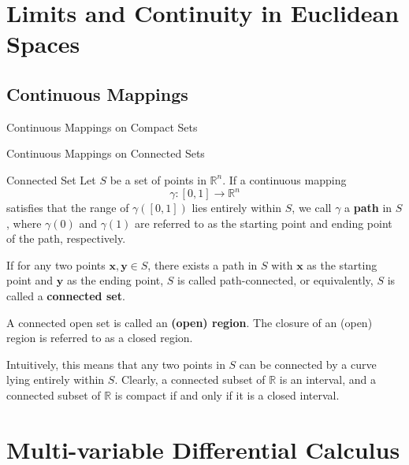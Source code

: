 \documentclass[11pt]{../../TexTemplate/elegantbook}
\begin{document}
\chapter{Limits and Continuity in Euclidean Spaces}

\section{Continuous Mappings}
\begin{leftbarTitle}{Continuous Mappings on Compact Sets}\end{leftbarTitle}

\begin{leftbarTitle}{Continuous Mappings on Connected Sets}\end{leftbarTitle}
\begin{definition}{Connected Set}
    Let \(S\) be a set of points in \(\mathbb{R}^n\). 
    If a continuous mapping 
    \[
        \gamma: [0, 1] \to \mathbb{R}^n
    \]
    satisfies that the range of \(\gamma([0, 1])\) lies entirely within \(S\), 
    we call \(\gamma\) a \textbf{path} in \(S\), 
    where \(\gamma(0)\) and \(\gamma(1)\) are referred to as the starting point and ending point of the path, respectively.  
    
    If for any two points \(\mathbf{x}, \mathbf{y} \in S\), 
    there exists a path in \(S\) with \(\mathbf{x}\) as the starting point and \(\mathbf{y}\) as the ending point, 
    \(S\) is called path-connected, or equivalently, \(S\) is called a \textbf{connected set}.  
    
    A connected open set is called an \textbf{(open) region}. The closure of an (open) region is referred to as a closed region.
\end{definition}

\begin{remark}
    Intuitively, this means that any two points in \(S\) can be connected 
    by a curve lying entirely within \(S\). 
    Clearly, a connected subset of \(\mathbb{R}\) is an interval, 
    and a connected subset of \(\mathbb{R}\) is compact if and only if it is a closed interval.
\end{remark}



\chapter{Multi-variable Differential Calculus}
\end{document}
